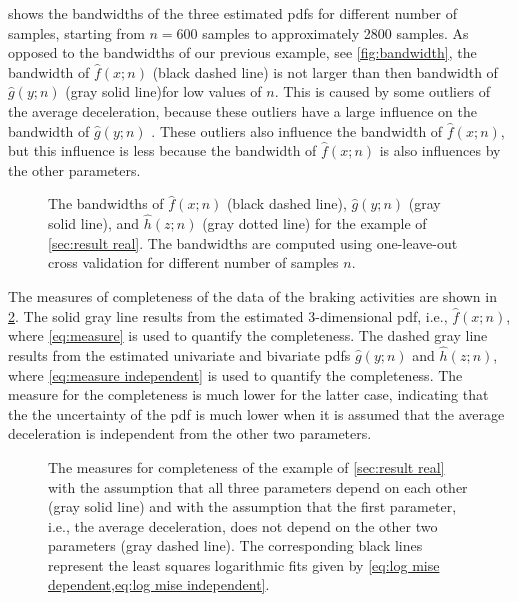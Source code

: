  shows the bandwidths of the three estimated pdfs for different number of samples, starting from $n=600$ samples to approximately 2800 samples. As opposed to the bandwidths of our previous example, see \cref{fig:bandwidth}, the bandwidth of $\hat{f}(x;n)$ (black dashed line) is not larger than then bandwidth of $\hat{g}(y;n)$ (gray solid line)for low values of $n$. This is caused by some outliers of the average deceleration, because these outliers have a large influence on the bandwidth of $\hat{g}(y;n)$ \cite{hall1992global}. These outliers also influence the bandwidth of $\hat{f}(x;n)$, but this influence is less because the bandwidth of $\hat{f}(x;n)$ is also influences by the other parameters.

\setlength{}
\setlength{}
\begin{figure}
	\centering
	
	\caption{The bandwidths of $\hat{f}(x;n)$ (black dashed line), $\hat{g}(y;n)$ (gray solid line), and $\hat{h}(z;n)$ (gray dotted line) for the example of \cref{sec:result real}. The bandwidths are computed using one-leave-out cross validation for different number of samples $n$.}
	\label{fig:bandwidth real}
\end{figure}

The measures of completeness of the data of the braking activities are shown in \cref{fig:mise real}. The solid gray line results from the estimated 3-dimensional pdf, i.e., $\hat{f}(x;n)$, where \cref{eq:measure} is used to quantify the completeness. The dashed gray line results from the estimated univariate and bivariate pdfs $\hat{g}(y;n)$ and $\hat{h}(z;n)$, where \cref{eq:measure independent} is used to quantify the completeness. The measure for the completeness is much lower for the latter case, indicating that the the uncertainty of the pdf is much lower when it is assumed that the average deceleration is independent from the other two parameters.

\setlength\figurewidth{\linewidth}
\setlength\figureheight{\linewidth}
\begin{figure}
	\centering
	
	\caption{The measures for completeness of the example of \cref{sec:result real} with the assumption that all three parameters depend on each other (gray solid line) and with the assumption that the first parameter, i.e., the average deceleration, does not depend on the other two parameters (gray dashed line). The corresponding black lines represent the least squares logarithmic fits given by \cref{eq:log mise dependent,eq:log mise independent}.}
	\label{fig:mise real}
\end{figure}


